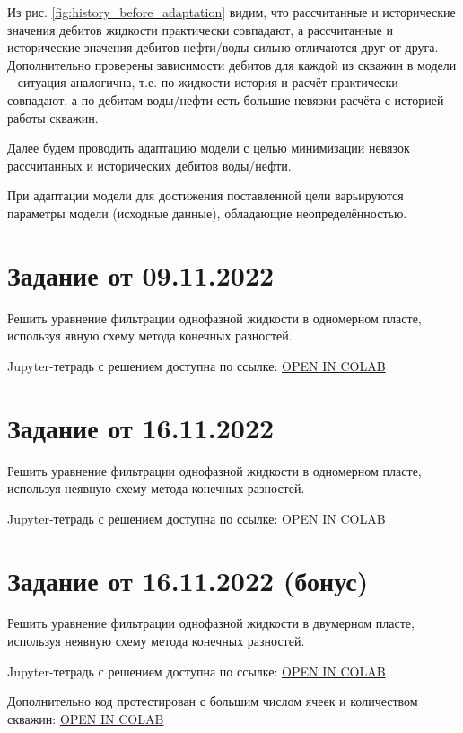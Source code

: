 \documentclass[a4paper,12pt]{article}
\begin{document}
Из рис. \ref{fig:history_before_adaptation} видим, что рассчитанные и исторические значения дебитов жидкости практически совпадают, а рассчитанные и исторические значения дебитов нефти/воды сильно отличаются друг от друга.
Дополнительно проверены зависимости дебитов для каждой из скважин в модели -- ситуация аналогична, т.е. по жидкости история и расчёт практически совпадают, а по дебитам воды/нефти есть большие невязки расчёта с историей работы скважин. 

Далее будем проводить адаптацию модели с целью минимизации невязок рассчитанных и исторических дебитов воды/нефти.

При адаптации модели для достижения поставленной цели варьируются параметры модели (исходные данные), обладающие неопределённостью.



\newpage
\section{Задание от 09.11.2022}

Решить уравнение фильтрации однофазной жидкости в одномерном пласте, используя явную схему метода конечных разностей.

Jupyter-тетрадь с решением доступна по ссылке: \href{https://colab.research.google.com/github/mualal/notebooks-source/blob/master/10_one_dimensional_filtration.ipynb}{OPEN IN COLAB}

\newpage
\section{Задание от 16.11.2022}

Решить уравнение фильтрации однофазной жидкости в одномерном пласте, используя неявную схему метода конечных разностей.

Jupyter-тетрадь с решением доступна по ссылке: \href{https://colab.research.google.com/github/mualal/notebooks-source/blob/master/10_one_dimensional_filtration.ipynb}{OPEN IN COLAB}

\newpage
\section{Задание от 16.11.2022 (бонус)}

Решить уравнение фильтрации однофазной жидкости в двумерном пласте, используя неявную схему метода конечных разностей.

Jupyter-тетрадь с решением доступна по ссылке: \href{https://colab.research.google.com/github/mualal/notebooks-source/blob/master/12_two_dimensional_filtration.ipynb}{OPEN IN COLAB}

Дополнительно код протестирован с большим числом ячеек и количеством скважин: \href{https://colab.research.google.com/github/mualal/notebooks-source/blob/master/13_two_dimensional_filtration.ipynb}{OPEN IN COLAB}
\end{document}
